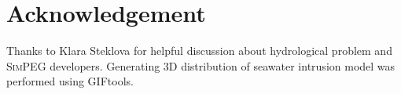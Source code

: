 \documentclass{segabs}
\newcommand{\SimPEG}{\textsc{SimPEG}\xspace}
\begin{document}
\section{Acknowledgement}
Thanks to Klara Steklova for helpful discussion about hydrological problem and  \SimPEG developers. Generating 3D distribution of seawater intrusion model was performed using GIFtools.

\twocolumn
\onecolumn
% 

\end{document}

